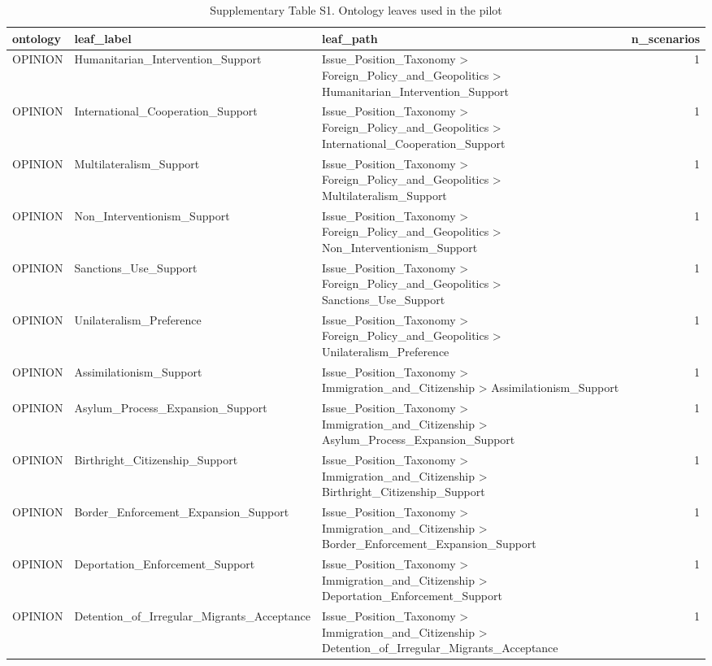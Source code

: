 \begin{table}[htbp]
\centering
\begin{threeparttable}
\caption{Supplementary Table S1. Ontology leaves used in the pilot}
\label{tab:supp_ontology}
\small
\begin{tabular}{lllr}
\toprule
ontology & leaf\_label & leaf\_path & n\_scenarios \\
\midrule
OPINION & Humanitarian\_Intervention\_Support & Issue\_Position\_Taxonomy > Foreign\_Policy\_and\_Geopolitics > Humanitarian\_Intervention\_Support & 1 \\
OPINION & International\_Cooperation\_Support & Issue\_Position\_Taxonomy > Foreign\_Policy\_and\_Geopolitics > International\_Cooperation\_Support & 1 \\
OPINION & Multilateralism\_Support & Issue\_Position\_Taxonomy > Foreign\_Policy\_and\_Geopolitics > Multilateralism\_Support & 1 \\
OPINION & Non\_Interventionism\_Support & Issue\_Position\_Taxonomy > Foreign\_Policy\_and\_Geopolitics > Non\_Interventionism\_Support & 1 \\
OPINION & Sanctions\_Use\_Support & Issue\_Position\_Taxonomy > Foreign\_Policy\_and\_Geopolitics > Sanctions\_Use\_Support & 1 \\
OPINION & Unilateralism\_Preference & Issue\_Position\_Taxonomy > Foreign\_Policy\_and\_Geopolitics > Unilateralism\_Preference & 1 \\
OPINION & Assimilationism\_Support & Issue\_Position\_Taxonomy > Immigration\_and\_Citizenship > Assimilationism\_Support & 1 \\
OPINION & Asylum\_Process\_Expansion\_Support & Issue\_Position\_Taxonomy > Immigration\_and\_Citizenship > Asylum\_Process\_Expansion\_Support & 1 \\
OPINION & Birthright\_Citizenship\_Support & Issue\_Position\_Taxonomy > Immigration\_and\_Citizenship > Birthright\_Citizenship\_Support & 1 \\
OPINION & Border\_Enforcement\_Expansion\_Support & Issue\_Position\_Taxonomy > Immigration\_and\_Citizenship > Border\_Enforcement\_Expansion\_Support & 1 \\
OPINION & Deportation\_Enforcement\_Support & Issue\_Position\_Taxonomy > Immigration\_and\_Citizenship > Deportation\_Enforcement\_Support & 1 \\
OPINION & Detention\_of\_Irregular\_Migrants\_Acceptance & Issue\_Position\_Taxonomy > Immigration\_and\_Citizenship > Detention\_of\_Irregular\_Migrants\_Acceptance & 1 \\

\end{tabular}
\end{threeparttable}
\end{table}
